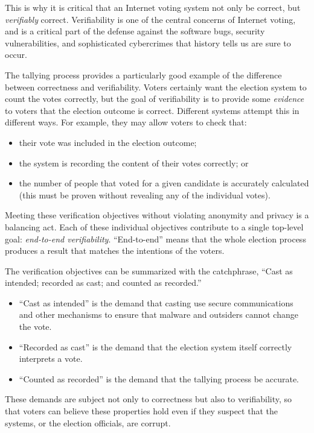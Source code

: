 This is why it is critical that an Internet voting system not only be
correct, but \emph{verifiably} correct. Verifiability is one of the
central concerns of Internet voting, and is a critical part of the
defense against the software bugs, security vulnerabilities, and
sophisticated cybercrimes that history tells us are sure to occur.

The tallying process provides a particularly good example of the
difference between correctness and verifiability. Voters certainly
want the election system to count the votes correctly, but the goal of
verifiability is to provide some \emph{evidence} to voters that the
election outcome is correct. Different systems attempt this in
different ways. For example, they may allow voters to check that:

\begin{itemize}
\item their vote was included in the election outcome; 
\item the system is recording the content of their
votes correctly; or
\item the number of people that voted for a given candidate is
  accurately calculated (this must be proven without revealing any of
  the individual votes).
\end{itemize}

Meeting these verification objectives without violating anonymity and
privacy is a balancing act. Each of these individual objectives
contribute to a single top-level goal: \emph{end-to-end verifiability}.
``End-to-end'' means that the whole election process produces a result
that matches the intentions of the voters.

The verification objectives can be summarized with the catchphrase,
``Cast as intended; recorded as cast; and counted as recorded.''

\begin{itemize}
\item ``Cast as intended'' is the demand that casting use secure
  communications and other mechanisms to ensure that malware and
  outsiders cannot change the vote.
\item``Recorded as cast'' is the demand that the election system
  itself correctly interprets a vote.
\item ``Counted as recorded'' is the demand that the tallying process
  be accurate.
\end{itemize}

These demands are subject not only to correctness but also to
verifiability, so that voters can believe these properties hold even
if they suspect that the systems, or the election officials, are
corrupt.

